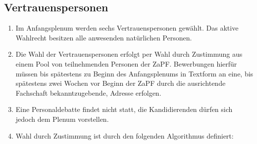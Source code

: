 \documentclass[
  a4paper,
  oneside]{scrartcl}
\providecommand{\tightlist}{%
  \setlength{\itemsep}{0pt}\setlength{\parskip}{0pt}}
\begin{document}
\hypertarget{vertrauenspersonen}{%
\subsection{Vertrauenspersonen}\label{vertrauenspersonen}}

\begin{enumerate}
\def\labelenumi{\arabic{enumi}.}
\tightlist
\item
  Im Anfangsplenum werden sechs Vertrauenspersonen gewählt. Das aktive
  Wahlrecht besitzen alle anwesenden natürlichen Personen.
\item
  Die Wahl der Vertrauenspersonen erfolgt per Wahl durch Zustimmung aus
  einem Pool von teilnehmenden Personen der ZaPF. Bewerbungen hierfür
  müssen bis spätestens zu Beginn des Anfangsplenums in Textform an
  eine, bis spätestens zwei Wochen vor Beginn der ZaPF durch die
  ausrichtende Fachschaft bekanntzugebende, Adresse erfolgen.
\item
  Eine Personaldebatte findet nicht statt, die Kandidierenden dürfen
  sich jedoch dem Plenum vorstellen.
\item
  Wahl durch Zustimmung ist durch den folgenden Algorithmus definiert:


\end{enumerate}
\end{document}
